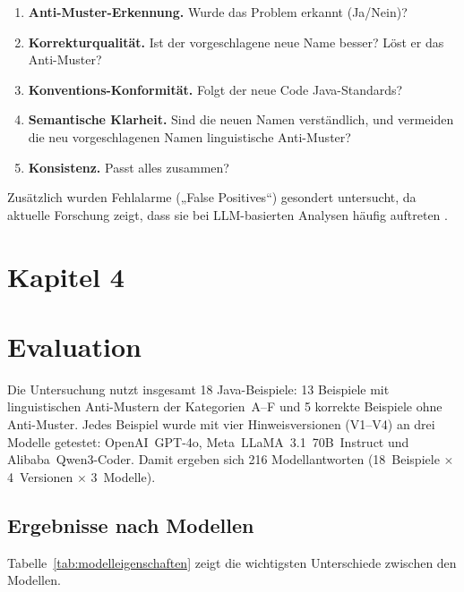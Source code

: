 \documentclass[a4paper,12pt]{article}
\begin{document}
\begin{enumerate}
    \item \textbf{Anti-Muster-Erkennung.} Wurde das Problem erkannt (Ja/Nein)?

    \item \textbf{Korrekturqualität.} Ist der vorgeschlagene neue Name besser? Löst er das Anti-Muster?

    \item \textbf{Konventions-Konformität.} Folgt der neue Code Java-Standards?

    \item \textbf{Semantische Klarheit.} Sind die neuen Namen verständlich, und vermeiden die neu vorgeschlagenen Namen linguistische Anti-Muster?

    \item \textbf{Konsistenz.} Passt alles zusammen?
\end{enumerate}

Zusätzlich wurden Fehlalarme („False Positives“) gesondert untersucht, da aktuelle Forschung zeigt, dass sie bei LLM-basierten Analysen häufig auftreten \cite{llmdetection2025, llmmaintainablereliable2025}.


\newpage
\section*{Kapitel 4}
\section{Evaluation}

Die Untersuchung nutzt insgesamt 18 Java-Beispiele: 13 Beispiele mit linguistischen Anti-Mustern der Kategorien~A--F und 5 korrekte Beispiele ohne Anti-Muster. Jedes Beispiel wurde mit vier Hinweisversionen (V1--V4) an drei Modelle getestet: OpenAI~GPT-4o, Meta~LLaMA~3.1~70B~Instruct und Alibaba~Qwen3-Coder. Damit ergeben sich 216 Modellantworten (18~Beispiele $\times$ 4~Versionen $\times$ 3~Modelle).

\subsection{Ergebnisse nach Modellen}

Tabelle~\ref{tab:modelleigenschaften} zeigt die wichtigsten Unterschiede zwischen den Modellen.%
\end{document}
